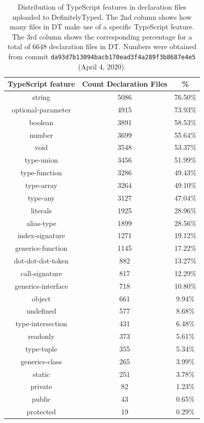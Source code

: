 \documentclass[english,cleveref,autoref,submission]{programming}
\begin{document}
\begin{table}[tp]
  \begin{center}
    \begin{tabular}{ |c|c|c| } 
      \hline
      \textbf{TypeScript feature} & \textbf{Count Declaration Files} & \textbf{\%} \\ 
      \hline
      string & 5086 & 76.50\% \\
      optional-parameter & 4915 & 73.93\% \\
      boolean & 3891 & 58.53\% \\
      number & 3699 & 55.64\% \\
      void & 3548 & 53.37\% \\
      type-union & 3456 & 51.99\% \\
      type-function & 3286 & 49.43\% \\
      type-array & 3264 & 49.10\% \\
      type-any & 3127 & 47.04\% \\
      literals & 1925 & 28.96\% \\
      alias-type & 1899 & 28.56\% \\
      index-signature & 1271 & 19.12\% \\
      generics-function & 1145 & 17.22\% \\
      dot-dot-dot-token & 882 & 13.27\% \\
      call-signature & 817 & 12.29\% \\
      generics-interface & 718 & 10.80\% \\
      object & 661 & 9.94\% \\
      undefined & 577 & 8.68\% \\
      type-intersection & 431 & 6.48\% \\
      readonly & 373 & 5.61\% \\
      type-tuple & 355 & 5.34\% \\
      generics-class & 265 & 3.99\% \\
      static & 251 & 3.78\% \\
      private & 82 & 1.23\% \\
      public & 43 & 0.65\% \\
      protected & 19 & 0.29\% \\
      \hline
    \end{tabular}
  \end{center}
  \caption{Distribution of TypeScript features in declaration files uploaded to DefinitelyTyped. The 2nd column shows how many files in DT make use of a specific TypeScript feature. The 3rd column shows the corresponding percentage for a total of 6648 declaration files in DT. Numbers were obtained from commit \texttt{da93d7b13094bacb170ead3f4a289f3b8687e4e5} (April 4, 2020).}
  \label{tab:dts-parse-stats}
\end{table}
\end{document}
